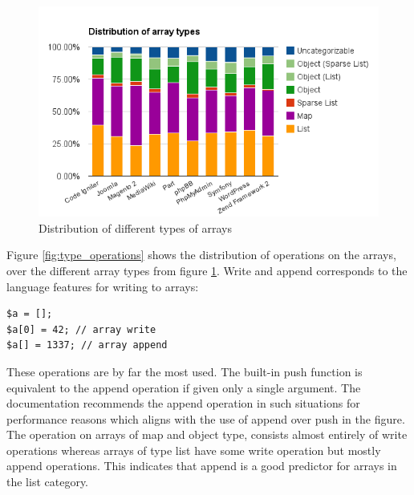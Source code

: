 \begin{figure}[htbp]
\centering
\includegraphics[width=\textwidth]{chapters/study/g1.png}
\caption{Distribution of different types of arrays}
\label{fig:array_types}
\end{figure}

Figure \ref{fig:type_operations} shows the distribution of operations on the arrays, over the different array types from figure \ref{fig:array_types}. Write and append corresponds to the language features for writing to arrays:

\begin{lstlisting}
$a = [];
$a[0] = 42; // array write
$a[] = 1337; // array append
\end{lstlisting}

These operations are by far the most used. The built-in push function is equivalent to the append operation if given only a single argument. The documentation recommends the append operation in such situations for performance reasons which aligns with the use of append over push in the figure. The operation on arrays of map and object type, consists almost entirely of write operations whereas arrays of type list have some write operation but mostly append operations. This indicates that append is a good predictor for arrays in the list category.

